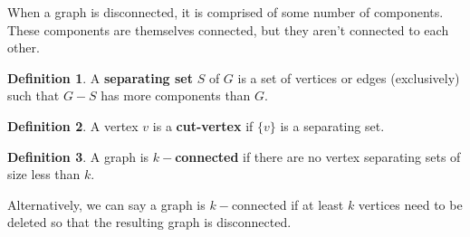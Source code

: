 \documentclass[12pt]{article}
\theoremstyle{definition}
\newtheorem{defn}{Definition}[section]
\begin{document}
When a graph is disconnected, it is comprised of some number of components. These components are themselves connected, but they aren't connected to each other.

\begin{bluebox}
    \begin{defn}
        A \textbf{separating set} $S$ of $G$ is a set of vertices or edges (exclusively) such that $G - S$ has more components than $G$.
    \end{defn}
\end{bluebox}

\begin{bluebox}
    \begin{defn}
        A vertex $v$ is a \textbf{cut-vertex} if $\{v\}$ is a separating set.
    \end{defn}
\end{bluebox}

\begin{bluebox}
    \begin{defn}
        A graph is \textbf{$k-$connected} if there are no vertex separating sets of size less than $k$.
    \end{defn}
\end{bluebox}

Alternatively, we can say a graph is $k-$connected if at least $k$ vertices need to be deleted so that the resulting graph is disconnected.
\end{document}
